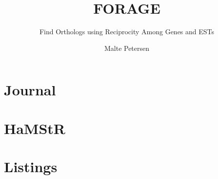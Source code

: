 \documentclass[a4paper]{scrreprt}
\title{FORAGE}
\subtitle{Find Orthologs using Reciprocity Among Genes and ESTs}
\author{Malte Petersen}
\begin{document}
\maketitle
\tableofcontents

\chapter{Journal}


\chapter{HaMStR}


\clearpage




\appendix

\chapter{Listings}

\end{document}
